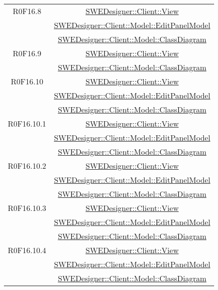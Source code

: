 \documentclass[../SpecificaTecnica.tex]{subfiles}
\begin{document}
\begin{longtable}{|c|c|}
		R0F16.8 & \hyperlink{SWEDesigner::Client::View}{SWEDesigner::Client::View} \\& \hyperlink{SWEDesigner::Client::Model::EditPanelModel}{SWEDesigner::Client::Model::EditPanelModel} \\& \hyperlink{SWEDesigner::Client::Model::ClassDiagram}{SWEDesigner::Client::Model::ClassDiagram}\\\hline
		R0F16.9 & \hyperlink{SWEDesigner::Client::View}{SWEDesigner::Client::View} \\& \hyperlink{SWEDesigner::Client::Model::ClassDiagram}{SWEDesigner::Client::Model::ClassDiagram}\\\hline
		R0F16.10 & \hyperlink{SWEDesigner::Client::View}{SWEDesigner::Client::View} \\& \hyperlink{SWEDesigner::Client::Model::EditPanelModel}{SWEDesigner::Client::Model::EditPanelModel} \\& \hyperlink{SWEDesigner::Client::Model::ClassDiagram}{SWEDesigner::Client::Model::ClassDiagram}\\\hline
		R0F16.10.1 & \hyperlink{SWEDesigner::Client::View}{SWEDesigner::Client::View} \\& \hyperlink{SWEDesigner::Client::Model::EditPanelModel}{SWEDesigner::Client::Model::EditPanelModel} \\& \hyperlink{SWEDesigner::Client::Model::ClassDiagram}{SWEDesigner::Client::Model::ClassDiagram}\\\hline
		R0F16.10.2 & \hyperlink{SWEDesigner::Client::View}{SWEDesigner::Client::View} \\& \hyperlink{SWEDesigner::Client::Model::EditPanelModel}{SWEDesigner::Client::Model::EditPanelModel} \\& \hyperlink{SWEDesigner::Client::Model::ClassDiagram}{SWEDesigner::Client::Model::ClassDiagram}\\\hline
		R0F16.10.3 & \hyperlink{SWEDesigner::Client::View}{SWEDesigner::Client::View} \\& \hyperlink{SWEDesigner::Client::Model::EditPanelModel}{SWEDesigner::Client::Model::EditPanelModel} \\& \hyperlink{SWEDesigner::Client::Model::ClassDiagram}{SWEDesigner::Client::Model::ClassDiagram}\\\hline
		R0F16.10.4 & \hyperlink{SWEDesigner::Client::View}{SWEDesigner::Client::View} \\& \hyperlink{SWEDesigner::Client::Model::EditPanelModel}{SWEDesigner::Client::Model::EditPanelModel} \\& \hyperlink{SWEDesigner::Client::Model::ClassDiagram}{SWEDesigner::Client::Model::ClassDiagram}\\\hline

\end{longtable}
\end{document}

